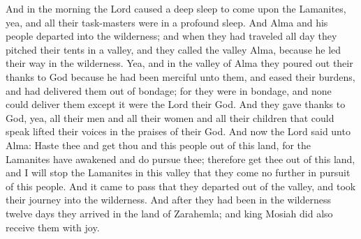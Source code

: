 \bverse \iffalse And in the morning the Lord caused a deep sleep to come upon the Lamanites, yea, and all their task-masters were in a profound sleep. \fi
And in the morning the Lord caused a deep sleep to come upon the Lamanites, yea, and all their task-masters were in a profound sleep.
\bverse \iffalse And Alma and his people departed into the wilderness; and when they had traveled all day they pitched their tents in a valley, and they called the valley Alma, because he led their way in the wilderness. \fi
And Alma and his people departed into the wilderness; and when they had traveled all day they pitched their tents in a valley, and they called the valley Alma, because he led their way in the wilderness.
\bverse \iffalse Yea, and in the valley of Alma they poured out their thanks to God because he had been merciful unto them, and eased their burdens, and had delivered them out of bondage; for they were in bondage, and none could deliver them except it were the Lord their God. \fi
Yea, and in the valley of Alma they poured out their thanks to God because he had been merciful unto them, and eased their burdens, and had delivered them out of bondage; for they were in bondage, and none could deliver them except it were the Lord their God.
\bverse \iffalse And they gave thanks to God, yea, all their men and all their women and all their children that could speak lifted their voices in the praises of their God. \fi
And they gave thanks to God, yea, all their men and all their women and all their children that could speak lifted their voices in the praises of their God.
\bverse \iffalse And now the Lord said unto Alma: Haste thee and get thou and this people out of this land, for the Lamanites have awakened and do pursue thee; therefore get thee out of this land, and I will stop the Lamanites in this valley that they come no further in pursuit of this people. \fi
And now the Lord said unto Alma: Haste thee and get thou and this people out of this land, for the Lamanites have awakened and do pursue thee; therefore get thee out of this land, and I will stop the Lamanites in this valley that they come no further in pursuit of this people.
\bverse \iffalse And it came to pass that they departed out of the valley, and took their journey into the wilderness. \fi
And it came to pass that they departed out of the valley, and took their journey into the wilderness.
\bverse \iffalse And after they had been in the wilderness twelve days they arrived in the land of Zarahemla; and king Mosiah did also receive them with joy. \fi
And after they had been in the wilderness twelve days they arrived in the land of Zarahemla; and king Mosiah did also receive them with joy.


